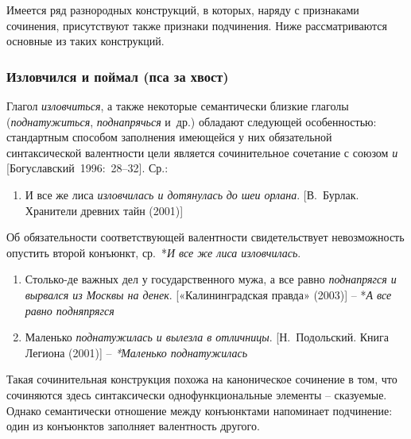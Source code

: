 Имеется ряд разнородных конструкций, в которых, наряду с признаками
сочинения, присутствуют также признаки подчинения. Ниже рассматриваются
основные из таких конструкций.

\hypertarget{ux438ux437ux43bux43eux432ux447ux438ux43bux441ux44f-ux438-ux43fux43eux439ux43cux430ux43b-ux43fux441ux430-ux437ux430-ux445ux432ux43eux441ux442}{%
\subsubsection{Изловчился и поймал (пса за
хвост)}\label{ux438ux437ux43bux43eux432ux447ux438ux43bux441ux44f-ux438-ux43fux43eux439ux43cux430ux43b-ux43fux441ux430-ux437ux430-ux445ux432ux43eux441ux442}}

Глагол \emph{изловчиться}, а также некоторые семантически близкие
глаголы (\emph{поднатужиться}, \emph{поднапрячься} и~др.) обладают
следующей особенностью: стандартным способом заполнения имеющейся у них
обязательной синтаксической валентности цели является сочинительное
сочетание с союзом \emph{и} {[}Богуславский~1996:~28--32{]}. Ср.:

\begin{enumerate}
\def\labelenumi{(\arabic{enumi})}
\setcounter{enumi}{48}
\item
  И все же лиса \emph{изловчилась и дотянулась} \emph{до шеи орлана}.
  {[}В.~Бурлак. Хранители древних тайн (2001){]}
\end{enumerate}

Об обязательности соответствующей валентности свидетельствует
невозможность опустить второй конъюнкт, ср.~*\emph{И все же лиса
изловчилась}.

\begin{enumerate}
\def\labelenumi{(\arabic{enumi})}
\setcounter{enumi}{49}
\item
  Столько-де важных дел у государственного мужа, а все равно
  \emph{поднапрягся и вырвался из Москвы на денек}. {[}«Калининградская
  правда» (2003){]} -- *\emph{А все равно подняпрягся}
\item
  Маленько \emph{поднатужилась и вылезла в отличницы}. {[}Н.~Подольский.
  Книга Легиона (2001){]} -- \emph{*Маленько поднатужилась}
\end{enumerate}

Такая сочинительная конструкция похожа на каноническое сочинение в том,
что сочиняются здесь синтаксически однофункциональные элементы --
сказуемые. Однако семантически отношение между конъюнктами напоминает
подчинение: один из конъюнктов заполняет валентность другого.

